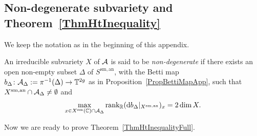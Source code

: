 \subsection{Non-degenerate subvariety and
 Theorem~\ref{ThmHtInequality}}
 We keep the notation as in the beginning of this appendix. 
\begin{definition}\label{DefinitionNonDegenerateApp}
An irreducible subvariety $X$ of $\mathcal{A}$ is said to be
\textit{non-degenerate} if there exists an open non-empty subset
$\Delta$ of $S^{\mathrm{sm},\mathrm{an}}$,
   with the Betti map
$b_{\Delta} \colon \mathcal{A}_{\Delta}:=\pi^{-1}(\Delta) \rightarrow
\mathbb{T}^{2g}$ as in Proposition~\ref{PropBettiMapApp}, such that
$X^\mathrm{sm,an}\cap \mathcal{A}_{\Delta}\not=\emptyset$ and 
\[
\max_{x \in X^{\mathrm{sm}}({\mathbb{C}}) \cap \mathcal{A}_{\Delta}} \mathrm{rank}_{{\mathbb{R}}} (\mathrm{d}b_{\Delta}|_{X^{\mathrm{sm,an}}})_x = 2\dim X.
\]%
\end{definition}




Now we are ready to prove Theorem~\ref{ThmHtInequalityFull}.

